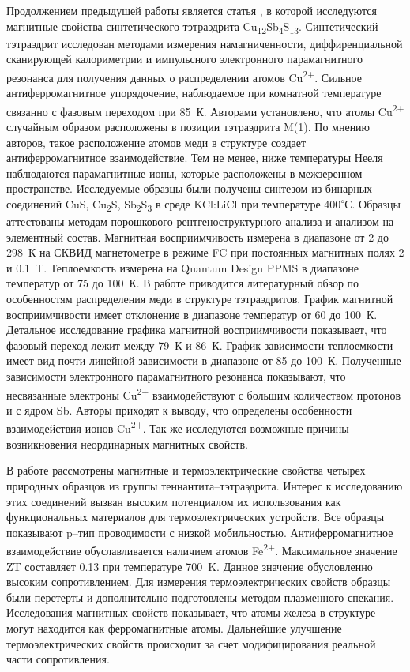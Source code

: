 Продолжением предыдушей работы является статья \cite{DiBenedetto2005}, в которой исследуются магнитные свойства синтетического тэтраэдрита Cu\textsubscript{12}Sb\textsubscript{4}S\textsubscript{13}. Синтетический тэтраэдрит исследован методами измерения намагниченности, диффиренциальной сканирующей калориметрии и импульсного электронного парамагнитного резонанса для получения данных о распределении атомов Cu\textsuperscript{2+}. 
Сильное антиферромагнитное упорядочение, наблюдаемое при комнатной температуре связанно с фазовым переходом при 85~К. Авторами установлено, что атомы Cu\textsuperscript{2+} случайным образом расположены в позиции тэтраэдрита M(1). По мнению авторов, такое расположение атомов меди в структуре создает антиферромагнитное взаимодействие. Тем не менее, ниже температуры Нееля наблюдаются парамагнитные ионы, которые расположены в межзеренном пространстве. Исследуемые образцы были получены синтезом из бинарных соединений CuS, Cu\textsubscript{2}S, Sb\textsubscript{2}S\textsubscript{3} в среде KCl:LiCl при температуре 400\textsuperscript{$\circ$}С. Образцы аттестованы методам порошкового рентгеноструктурного анализа и анализом на элементный состав. Магнитная восприимчивость измерена в диапазоне от 2 до 298~К на СКВИД магнетометре в режиме FC при постоянных магнитных полях 2 и 0.1~T. Теплоемкость измерена на Quantum Design
PPMS в диапазоне температур от 75 до 100~К. В работе приводится литературный обзор по особенностям распределения меди в структуре тэтраэдритов. График магнитной восприимчивости имеет отклонение в диапазоне температур от 60 до 100~К. Детальное исследование графика магнитной восприимчивости показывает, что фазовый переход лежит между 79~К и 86~К. График зависимости теплоемкости имеет вид почти линейной зависимости в диапазоне от 85 до 100~К. Полученные зависимости электронного парамагнитного резонанса показывают, что несвязанные электроны Cu\textsuperscript{2+} взаимодействуют с большим количеством протонов и с ядром Sb. Авторы приходят к выводу, что определены особенности взаимодействия ионов Cu\textsuperscript{2+}. Так же исследуются возможные причины возникновения неординарных магнитных свойств. 
 


В работе \cite{Levinsky_2015} рассмотрены магнитные и термоэлектрические свойства четырех природных образцов из группы теннантита--тэтраэдрита. Интерес к исследованию этих соединений вызван высоким потенциалом их использования как функциональных материалов для термоэлектрических устройств. Все образцы показывают p--тип проводимости с низкой мобильностью. Антиферромагнитное взаимодействие обуславливается наличием атомов Fe\textsuperscript{2+}. Максимальное значение ZT составляет 0.13 при температуре 700~K. Данное значение обусловленно высоким сопротивлением. Для измерения термоэлектрических свойств образцы были перетерты и дополнительно подготовлены методом плазменного спекания. Исследования магнитных свойств показывает, что  атомы железа в структуре могут находится как ферромагнитные атомы. Дальнейшие улучшение термоэлектрических свойств происходит за счет модифицирования реальной части сопротивления. 

